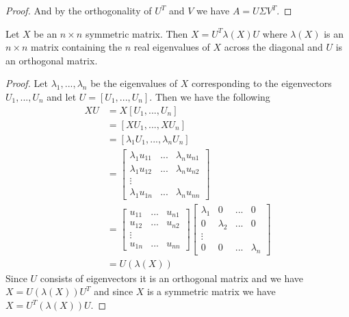 \begin{proof}
And by the orthogonality of $U^T$ and $V$ we have $A = U \Sigma V^T$.

\end{proof}

\begin{theorem}
\item Let $X$ be an $n \times n$ symmetric matrix. Then $X = U^T \lambda(X) U$ where $\lambda(X)$ is an $n \times n$ matrix containing the $n$ real eigenvalues of $X$ across the diagonal and $U$ is an orthogonal matrix.
\end{theorem}
\begin{proof}
\item Let $\lambda_1,...,\lambda_n$ be the eigenvalues of $X$ corresponding to the eigenvectors $U_1,...,U_n$ and let $U = [U_1,...,U_n]$. Then we have the following
\begin{align*}
XU &= X[U_1,...,U_n]\\
&= [XU_1,...,XU_n]\\
&= [\lambda_1 U_1,...,\lambda_n U_n]\\
&= \begin{bmatrix}
	\lambda_1 u_{11} & ... & \lambda_n u_{n1} \\
	\lambda_1 u_{12} & ... & \lambda_n u_{n2} \\
	\vdots \\
	\lambda_1 u_{1n} & ... & \lambda_n u_{nn}
\end{bmatrix} \\
&= \begin{bmatrix}
	u_{11} & ... & u_{n1} \\
	u_{12} & ... & u_{n2} \\
	\vdots \\
	u_{1n} & ... & u_{nn}
\end{bmatrix}
\begin{bmatrix}
	\lambda_1 & 0 & ... & 0 \\
	0 & \lambda_2 & ... & 0 \\
	\vdots \\
	0 & 0 & ... & \lambda_n
\end{bmatrix}\\
&= U(\lambda(X))
\end{align*}
Since $U$ consists of eigenvectors it is an orthogonal matrix and we have $X = U(\lambda(X))U^T$ and since $X$ is a symmetric matrix we have $X = U^T(\lambda(X))U$.
\end{proof}

